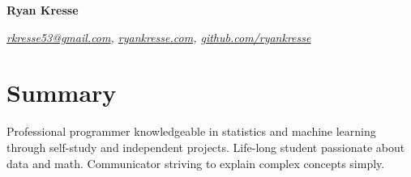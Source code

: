 \documentclass[10pt]{article}
\begin{document}
	\begin{flushleft}
		\textbf{{\Huge Ryan Kresse}}
	\end{flushleft}
	\emph{\href{mailto:rkresse53@gmail.com}{rkresse53@gmail.com}, \href{http://ryankresse.com/blog}{ryankresse.com}, \href{https://github.com/ryankresse}{github.com/ryankresse}}
	
	\section{Summary}
		Professional programmer knowledgeable in statistics and machine learning through self-study and independent projects.
		Life-long student passionate about data and math. Communicator striving to explain complex concepts simply.  
	\begin{comment}
	\section{Contact and Links}
		\begin{itemize}[noitemsep]
			\item rkresse53@gmail.com
			\item ryankresse.com
			\item github.com/ryankresse
		\end{itemize}
	\end{comment}
	
\end{document}
